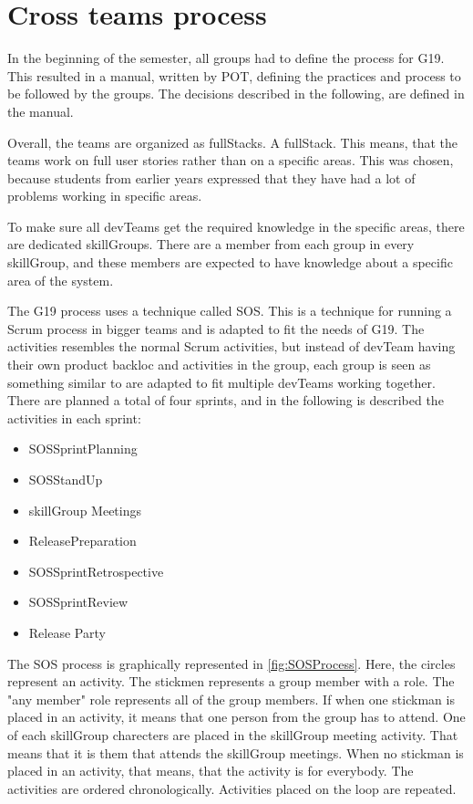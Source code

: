 \section{Cross teams process}
In the beginning of the semester, all groups had to define the process for \gls{G19}. 
This resulted in a manual\cite{processManual}, written by \gls{POT}, defining the practices and process to be followed by the groups. The decisions described in the following, are defined in the manual. 

Overall, the teams are organized as \Glspl{fullStack}. A \gls{fullStack}. This means, that the teams work on full user stories rather than on a specific areas. 
This was chosen, because students from earlier years expressed that they have had a lot of problems working in specific areas\cite{fullStackVSSpecific}.

To make sure all \glspl{devTeam} get the required knowledge in the specific areas, there are dedicated \glspl{skillGroup}. There are a member from each group in every \gls{skillGroup}, and these members are expected to have knowledge about a specific area of the system. 

The \gls{G19} process uses a technique called \gls{SOS}. This is a technique for running a Scrum process in bigger teams and is adapted to fit the needs of \gls{G19}. 
The activities resembles the normal Scrum activities, but instead of \gls{devTeam} having their own product backloc and activities in the group, each group is seen as something similar to  are adapted to fit multiple \glspl{devTeam} working together. There are planned a total of four sprints, and in the following is described the activities in each sprint:

\begin{itemize}
    \item \Gls{SOSSprintPlanning}
    \item \Gls{SOSStandUp}
    \item \Gls{skillGroup} Meetings
    \item \Gls{ReleasePreparation}
    \item \Gls{SOSSprintRetrospective}
    \item \Gls{SOSSprintReview}
    \item Release Party
\end{itemize}

The SOS process is graphically represented in \autoref{fig:SOSProcess}. Here, the circles represent an activity. The stickmen represents a group member with a role. The "any member" role represents all of the group members. If when one stickman is placed in an activity, it means that one person from the group has to attend. 
One of each \gls{skillGroup} charecters are placed in the \gls{skillGroup} meeting activity. That means that it is them that attends the \gls{skillGroup} meetings.
When no stickman is placed in an activity, that means, that the activity is for everybody. 
The activities are ordered chronologically. Activities placed on the loop are repeated.

